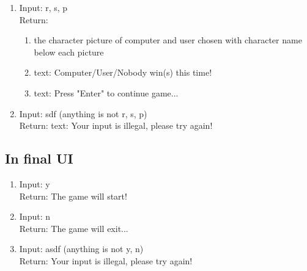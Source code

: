 \documentclass[12pt]{article}
\begin{document}
		\begin{enumerate}[$\bullet$]
			\item Input: r, s, p\\
			Return:
			\begin{enumerate}[1)]
				\item the character picture of computer and user chosen with character name below each picture
				\item text: Computer/User/Nobody win(s) this time!
				\item text: Press "Enter" to continue game...
			\end{enumerate}
		
			\item Input: sdf (anything is not r, s, p)\\
			Return: text: Your input is illegal, please try again!
		\end{enumerate}

	\subsection{In final UI}

		\begin{enumerate}[$\bullet$]
			\item Input: y\\
			Return: The game will start!
			\item Input: n\\
			Return: The game will exit...
			\item Input: asdf (anything is not y, n)\\
			Return: Your input is illegal, please try again!
		\end{enumerate}
	
\end{document}

